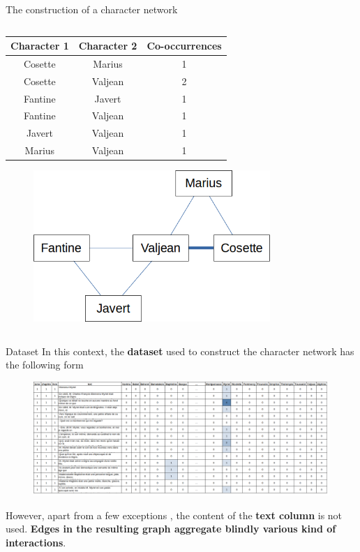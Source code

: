 \documentclass[10pt]{beamer}
\newcommand{\imp}[1]{\textbf{\color{cyan}#1}}
\begin{document}
\begin{frame}{The construction of a character network}
\begin{columns}
\begin{column}{0.5\textwidth}
\begin{table}
					\centering
					\scriptsize
					\begin{tabular}{|c|c|c|} 
						\hline
						Character 1 & Character 2 & Co-occurrences \\ 
						\hline
						Cosette & Marius & 1 \\
						Cosette & Valjean & 2 \\ 
						Fantine & Javert & 1 \\
						Fantine & Valjean & 1 \\
						Javert & Valjean & 1 \\
						Marius & Valjean & 1 \\
						\hline
					\end{tabular}
				\end{table}
				\begin{figure}
					\centering
					\includegraphics[width=0.8\textwidth]{img/mini_graph.png}
				\end{figure}
			\end{column}
		\end{columns}
	\end{frame}
	
	
	\begin{frame}{Dataset}
		In this context, the \imp{dataset} used to construct the character network has the following form
		\begin{figure}
			\centering
			\includegraphics[width=\textwidth]{img/data_table.png}
		\end{figure}
		However, apart from a few exceptions \cite{nalisnick_character--character_2013, trovati_towards_2014, min_modeling_2019}, the content of the \imp{text column} is not used. \imp{Edges in the resulting graph aggregate blindly various kind of interactions}.
	\end{frame}
	
\end{document}
